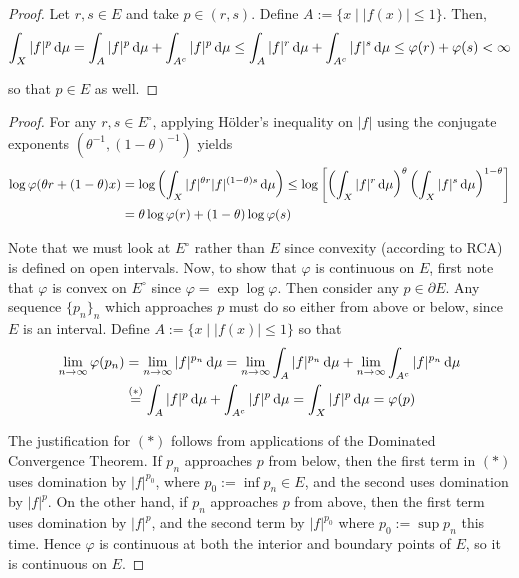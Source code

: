 \begin{proof}
     Let \(r, s \in E\) and take \(p \in (r, s)\). Define \(A := \{ x \mid |f(x)| \leq 1\}\). Then, 
    \[
        \int_X |f|^p \, \mathrm{d} \mu 
        = \int_{A} |f|^p \, \mathrm{d}\mu + \int_{A^c} |f|^p \, \mathrm{d}\mu
        \leq \int_A |f|^r \, \mathrm{d}\mu + \int_{A^c} |f|^s \, \mathrm{d}\mu
        \leq \varphi(r) + \varphi(s) < \infty
    \]

    so that \(p \in E\) as well. 
\end{proof}

\begin{proof}
     For any \(r, s \in E^\circ\), applying H\"older's inequality on \(|f|\) using the conjugate exponents \((\theta^{-1}, (1 - \theta)^{-1})\) yields
    \begin{align*}
        \log \varphi(\theta r + (1 - \theta) x) 
        &= \log \left( \int_X |f|^{\theta r} |f|^{(1 - \theta) s} \, \mathrm{d}\mu \right)
        \leq \log \left[ \left( \int_X |f|^r \, \mathrm{d}\mu \right)^\theta \left( \int_X |f|^s \, \mathrm{d}\mu \right)^{1 - \theta} \right] \\
        &= \theta \log \varphi(r) + (1 - \theta) \log \varphi(s)
    \end{align*}

    Note that we must look at \(E^\circ\) rather than \(E\) since convexity (according to RCA) is defined on open intervals. Now, to show that \(\varphi\) is continuous on \(E\), first note that \(\varphi\) is convex on \(E^\circ\) since \(\varphi = \exp \log \varphi\). Then consider any \(p \in \partial E\). Any sequence \(\{p_n\}_n\) which approaches \(p\) must do so either from above or below, since \(E\) is an interval. Define \(A := \{ x \mid |f(x)| \leq 1 \}\) so that 
    \begin{align*}
        \lim_{n \to \infty} \varphi(p_n) 
        &= \lim_{n \to \infty} |f|^{p_n} \, \mathrm{d}\mu 
        = \lim_{n \to \infty} \int_A |f|^{p_n} \, \mathrm{d}\mu + \lim_{n \to \infty} \int_{A^c} |f|^{p_n} \, \mathrm{d}\mu \\
        &\stackrel{(*)}{=} \int_A |f|^p \, \mathrm{d}\mu + \int_{A^c} |f|^p \, \mathrm{d}\mu
        = \int_X |f|^p \, \mathrm{d}\mu
        = \varphi(p)
    \end{align*}

    The justification for \((*)\) follows from applications of the Dominated Convergence Theorem. If \(p_n\) approaches \(p\) from below, then the first term in \((*)\) uses domination by \(|f|^{p_0}\), where \(p_0 := \inf p_n \in E\), and the second uses domination by \(|f|^p\). On the other hand, if \(p_n\) approaches \(p\) from above, then the first term uses domination by \(|f|^p\), and the second term by \(|f|^{p_0}\) where \(p_0 := \sup p_n\) this time. Hence \(\varphi\) is continuous at both the interior and boundary points of \(E\), so it is continuous on \(E\). 
\end{proof}

